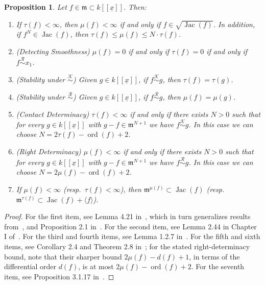 \documentclass{article}
\newtheorem{proposition}[theorem]{Proposition}
\DeclareMathOperator{\ord}{ord}
\DeclareMathOperator{\Jac}{Jac}
\newcommand{\kx}{k[[\underline{x}]]}
\newcommand{\equivr}{\overset{\mathcal{R}}{\sim}}
\newcommand{\equivk}{\overset{\mathcal{K}}{\sim}}
\numberwithin{theorem}{section}
\begin{document}
\begin{proposition}\label{prop:mt_basic}
Let $f\in\mathfrak{m}\subset\kx$. Then:
\begin{enumerate}
    \item If $\tau(f)<\infty$, then $\mu(f)<\infty$ if and only if $f\in\sqrt{\Jac(f)}$. In addition, if $f^N\in\Jac(f)$, then $\tau(f)\leq\mu(f)\leq N\cdot\tau(f)$.
    \item (Detecting Smoothness) $\mu(f)=0$ if and only if $\tau(f)=0$ if and only if $f\equivr x_1$.
    \item (Stability under $\equivk$) Given $g\in\kx$, if $f\equivk g$, then $\tau(f)=\tau(g)$.
    \item (Stability under $\equivr$) Given $g\in\kx$, if $f\equivr g$, then $\mu(f)=\mu(g)$.
    \item (Contact Determinacy) $\tau(f)<\infty$ if and only if there exists $N>0$ such that for every $g\in\kx$ with $g-f\in\mathfrak{m}^{N+1}$ we have $f\equivk g$. In this case we can choose $N=2\tau(f)-\ord(f)+2$.
    \item (Right Determinacy) $\mu(f)<\infty$ if and only if there exists $N>0$ such that for every $g\in\kx$ with $g-f\in\mathfrak{m}^{N+1}$ we have $f\equivr g$. In this case we can choose $N=2\mu(f)-\ord(f)+2$.
    \item If $\mu(f)<\infty$ (resp.\ $\tau(f)<\infty$), then $\mathfrak{m}^{\mu(f)}\subset\Jac(f)$ (resp.\ $\mathfrak{m}^{\tau(f)}\subset\Jac(f)+\langle f\rangle$).
\end{enumerate}
\end{proposition}

\begin{proof}
For the first item, see Lemma 4.21 in~\cite{svoray2025detecting}, which in turn generalizes results from~\cite{liu2018milnor}, and Proposition 2.1 in~\cite{hefez2019hypersurface}. For the second item, see Lemma 2.44 in Chapter I of~\cite{greuel2007introduction}. For the third and fourth items, see Lemma 1.2.7 in~\cite{boubakri2009hypersurface}. For the fifth and sixth items, see Corollary 2.4 and Theorem 2.8 in~\cite{boubakri2012invariants}; for the stated right-determinacy bound, note that their sharper bound $2\mu(f)-d(f)+1$, in terms of the differential order $d(f)$, is at most $2\mu(f)-\ord(f)+2$. For the seventh item, see Proposition 3.1.17 in~\cite{boubakri2009hypersurface}.
\end{proof}
\end{document}
